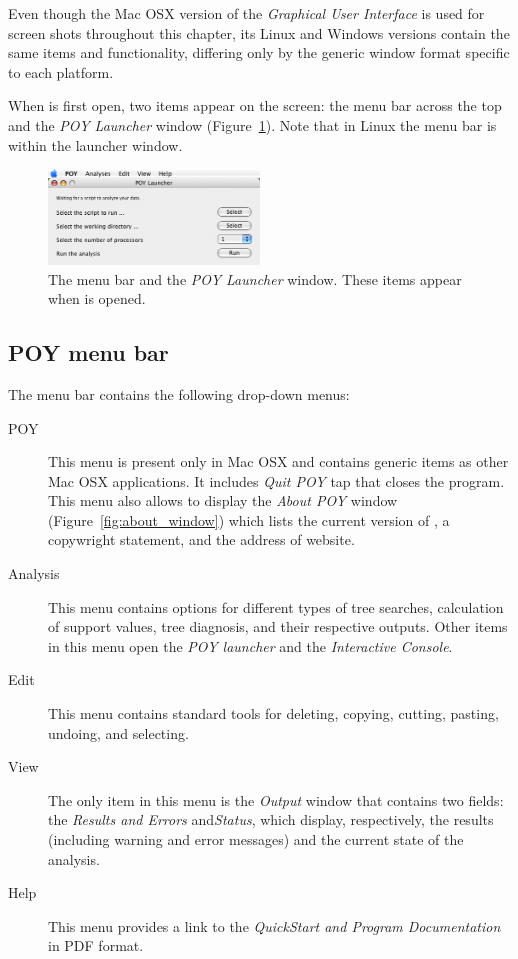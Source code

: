 Even though the Mac OSX version of the \emph{Graphical User Interface} is used for screen shots throughout this chapter, its Linux and Windows versions contain the same items and functionality, differing only by the generic window format specific to each platform.

When \poy is first open, two items appear on the screen: the menu bar across the top and the \emph{POY Launcher} window (Figure~\ref{fig:menu_launcher_window}). Note that in Linux the menu bar is within the launcher window.
\begin{figure}[htpb]
    \begin{center}
        \includegraphics[width=0.5\textwidth]{figures/menu_launcher_window.jpg}
    \end{center}
    \caption{The \poy menu bar and the \emph{POY Launcher} window. These items appear when \poy is opened.}
    \label{fig:menu_launcher_window}
\end{figure}

\subsection{POY menu bar}
The menu bar contains the following drop-down menus:
\begin{description}
\item[POY] This menu is present only in Mac OSX and contains generic items as other Mac OSX applications. It includes \emph{Quit POY} tap that closes the program. This menu also allows to display the \emph{About POY} window (Figure~\ref{fig:about_window}) which lists the current version of \poy, a copywright statement, and the address of \poy website.
\item[Analysis] This menu contains options for different types of tree searches, calculation of support values, tree diagnosis, and their respective outputs. Other items in this menu open the \emph{POY launcher} and the \emph{Interactive Console}.
\item[Edit] This menu contains standard tools for deleting, copying, cutting, pasting, undoing, and selecting.
\item[View] The only item in this menu is the \emph{Output} window that contains two fields: the \emph{Results and Errors} and\emph{Status}, which display, respectively, the results (including warning and error messages) and the current state of the analysis.
\item[Help] This menu provides a link to the \poy \emph{QuickStart and Program Documentation} in PDF format.
\end{description}

